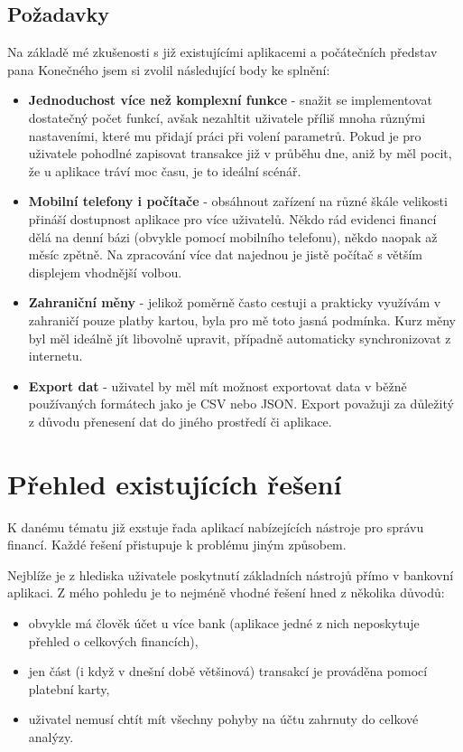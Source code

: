 \documentclass[
  biblatex,
  figures=false,
  tables=false,
  glossaries,
  index
]{kidiplom}
\begin{document}
\subsection{Požadavky}
Na základě mé zkušenosti s již existujícími aplikacemi a počátečních představ pana Konečného jsem si zvolil následující body ke splnění:

\begin{itemize}
  \item \textbf{Jednoduchost více než komplexní funkce} - snažit se implementovat dostatečný počet funkcí, avšak nezahltit uživatele příliš mnoha různými nastaveními, které mu přidají práci při volení parametrů. Pokud je pro uživatele pohodlné zapisovat transakce již v průběhu dne, aniž by měl pocit, že u aplikace tráví moc času, je to ideální scénář.
  \item \textbf{Mobilní telefony i počítače} - obsáhnout zařízení na různé škále velikosti přináší dostupnost aplikace pro více uživatelů. Někdo rád evidenci financí dělá na denní bázi (obvykle pomocí mobilního telefonu), někdo naopak až měsíc zpětně. Na zpracování více dat najednou je jistě počítač s větším displejem vhodnější volbou.
  \item \textbf{Zahraniční měny} - jelikož poměrně často cestuji a prakticky využívám v zahraničí pouze platby kartou, byla pro mě toto jasná podmínka. Kurz měny byl měl ideálně jít libovolně upravit, případně automaticky synchronizovat z internetu.
  \item \textbf{Export dat} - uživatel by měl mít možnost exportovat data v běžně používaných formátech jako je CSV nebo JSON. Export považuji za důležitý z důvodu přenesení dat do jiného prostředí či aplikace.
\end{itemize}

\section{Přehled existujících řešení}
K danému tématu již exstuje řada aplikací nabízejících nástroje pro správu financí. Každé řešení přistupuje k problému jiným způsobem. 

Nejblíže je z hlediska uživatele poskytnutí základních nástrojů přímo v bankovní aplikaci. Z mého pohledu je to nejméně vhodné řešení hned z několika důvodů:
\begin{itemize}
  \item obvykle má člověk účet u více bank (aplikace jedné z nich neposkytuje přehled o celkových financích),
  \item jen část (i když v dnešní době většinová) transakcí je prováděna pomocí platební karty,
  \item uživatel nemusí chtít mít všechny pohyby na účtu zahrnuty do celkové analýzy.
\end{itemize}
\end{document}
